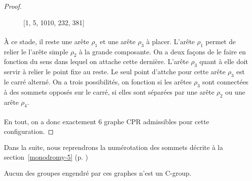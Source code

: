 \begin{proof}
\begin{figure}[H]
\begin{center}
\begin{tikzpicture}
    \end{tikzpicture}
    \caption{[1, 5, 1010, 232, 381]}
  \end{center}
\end{figure}

\paragraph{}
À ce stade, il reste une arête $\rho_1$ et une arête $\rho_3$ à placer. L'arête $\rho_1$ permet de relier le l'arête simple $\rho_2$ à la grande composante. On a deux façons de le faire en fonction du sens dans lequel on attache cette dernière. L'arête $\rho_3$ quant à elle doit servir à relier le point fixe au reste. Le seul point d'attche pour cette arête $\rho_3$ est le carré alterné. On a trois possibilités, on fonction si les arêtes $\rho_3$ sont connectées à des sommets opposés sur le carré, si elles sont séparées par une arête $\rho_2$ ou une arête $\rho_4$.

\paragraph{}
En tout, on a donc exactement 6 graphe CPR admissibles pour cette configuration.

\end{proof}

Dans la suite, nous reprendrons la numérotation des sommets décrite à la section~\ref{monodromy-5} (p. \pageref{monodromy-5})

\begin{theorem}
  Aucun des groupes engendré par ces graphes n'est un C-group.
\end{theorem}


